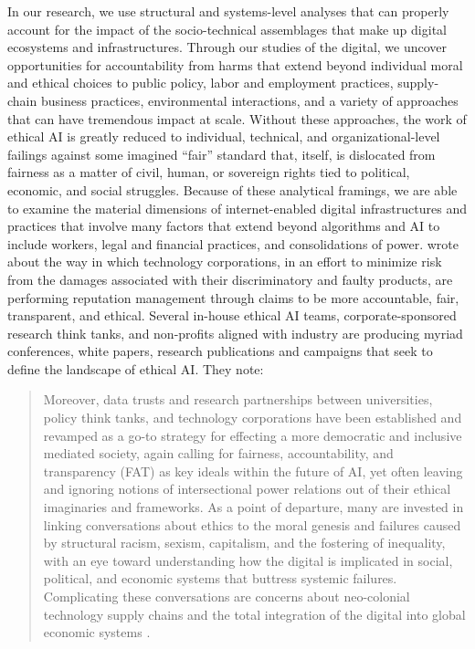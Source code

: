 \documentclass[11pt]{article}
\begin{document}
In our research, we use structural and systems-level analyses that can properly account for the impact of the socio-technical assemblages that make up digital  ecosystems and infrastructures. Through our studies of the digital, we uncover opportunities for accountability from harms that extend beyond individual moral and ethical choices to public policy, labor and employment practices, supply-chain business practices, environmental interactions, and a variety of approaches that can have tremendous impact at scale. Without these approaches, the work of ethical AI is greatly reduced to individual, technical, and organizational-level  failings against some imagined “fair” standard that, itself, is dislocated from fairness as a matter of civil, human, or sovereign rights tied to political, economic, and social struggles. Because of these analytical  framings, we are able to examine the material dimensions of internet-enabled digital infrastructures and practices that involve many factors that extend beyond algorithms and AI to include workers, legal and financial practices, and consolidations of power.   
\cite{BuiNoble} wrote about the way in which technology corporations, in an effort to minimize risk from the damages associated with their discriminatory and faulty products, are performing reputation management through claims to be more accountable, fair, transparent, and ethical. Several in-house ethical AI teams, corporate-sponsored research think tanks, and non-profits aligned with industry are producing myriad conferences, white papers, research publications and campaigns that seek to define the landscape of ethical AI. They note:
\begin{quote}
Moreover, data trusts and research partnerships between universities, policy think tanks, and technology corporations have been established and revamped as a go-to strategy for effecting a more democratic and inclusive mediated society, again calling for fairness, accountability, and transparency (FAT) as key ideals within the future of AI, yet often leaving and ignoring notions of intersectional power relations out of their ethical imaginaries and frameworks. As a point of departure, many are invested in linking conversations about ethics to the moral genesis and failures caused by structural racism, sexism, capitalism, and the fostering of inequality, with an eye toward understanding how the digital is implicated in social, political, and economic systems that buttress systemic failures. Complicating these conversations are concerns about neo-colonial technology supply chains and the total integration of the digital into global economic systems \cite{BuiNoble}.
\end{quote}
\end{document}
